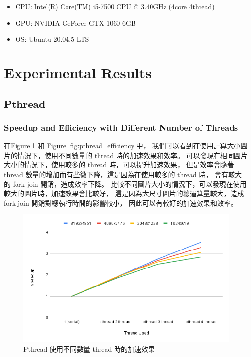 \documentclass[sigconf,nonacm]{acmart}
\begin{document}
\begin{itemize}
  \item CPU: Intel(R) Core(TM) i5-7500 CPU @ 3.40GHz (4core 4thread)
  \item GPU: NVIDIA GeForce GTX 1060 6GB
  \item OS: Ubuntu 20.04.5 LTS
\end{itemize}

\section{Experimental Results}

\subsection{Pthread}

\subsubsection{Speedup and Efficiency with Different Number of Threads}

在Figure \ref{fig:pthread_speedup} 和 Figure \ref{fig:pthread_efficiency}中，
我們可以看到在使用計算大小圖片的情況下，使用不同數量的 thread 時的加速效果和效率。
可以發現在相同圖片大小的情況下，使用較多的 thread 時，可以提升加速效果，
但是效率會隨著 thread 數量的增加而有些微下降，這是因為在使用較多的 thread 時，
會有較大的 fork-join 開銷，造成效率下降。
比較不同圖片大小的情況下，可以發現在使用較大的圖片時，加速效果會比較好，
這是因為大尺寸圖片的總運算量較大，造成 fork-join 開銷對總執行時間的影響較小，
因此可以有較好的加速效果和效率。

\begin{figure}[htbp]
  \centering
  \includegraphics[width=\linewidth]{"./image/pthread_speedup.png"}
  \caption{Pthread 使用不同數量 thread 時的加速效果}
  \label{fig:pthread_speedup}
\end{figure}
\end{document}

